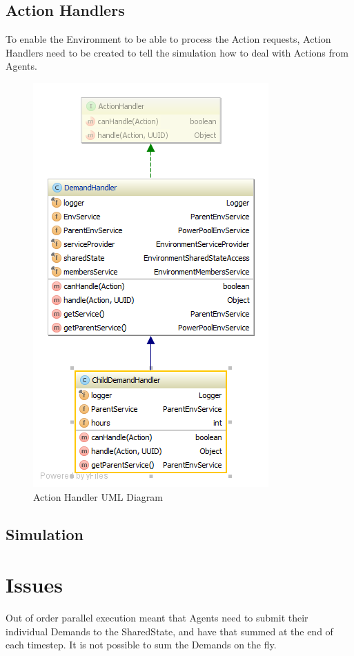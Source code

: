\subsection*{Action Handlers} %
To enable the Environment to be able to process the Action requests, Action Handlers need to be created to tell the simulation how to deal with Actions from Agents.

\begin{figure}[!h]
	\centering
	\includegraphics[scale=0.4]{Images/ActionHandlerUML.png}
	\caption{Action Handler UML Diagram}
	\label{fig:ActionHandlerUML}
\end{figure}

\subsection*{Simulation}


\section*{Issues}
Out of order parallel execution meant that Agents need to submit their individual Demands to the SharedState, and have that summed at the end of each timestep. It is not possible to sum the Demands on the fly.

